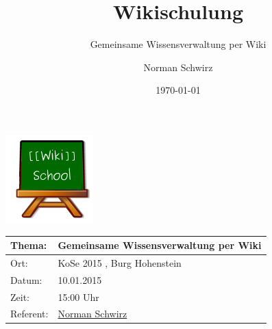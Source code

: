 \documentclass{beamer}              %
\title{Wikischulung}
\subtitle{Gemeinsame Wissensverwaltung per Wiki}
\author{Norman Schwirz}
\institute{StuRa der HTW Dresden, Bereich Schulungen}
\date{\today}
\begin{document}

\begin{frame} %
  \begin{center}
    \includegraphics[keepaspectratio=true, scale=1]{wikischool-logo}
    \begin{longtable}{|l|l|}
      \hline
        
       \textbf{Thema:}        &  \textbf{Gemeinsame Wissensverwaltung per Wiki}                  \\ 
      \hline       
       Ort:                   & KoSe 2015 , Burg Hohenstein                                      \\ 
      \hline       
       Datum:                 &  10.01.2015                                                      \\
      \hline       
       Zeit:                  &  15:00 Uhr                                                       \\ 
      \hline       
       Referent:              &  \href{http://www.stura.htw-dresden.de/members/NormanSchwirz}{Norman Schwirz}  \\ 
      \hline       
    \end{longtable}
  \end{center}
\end{frame}
\end{document}
